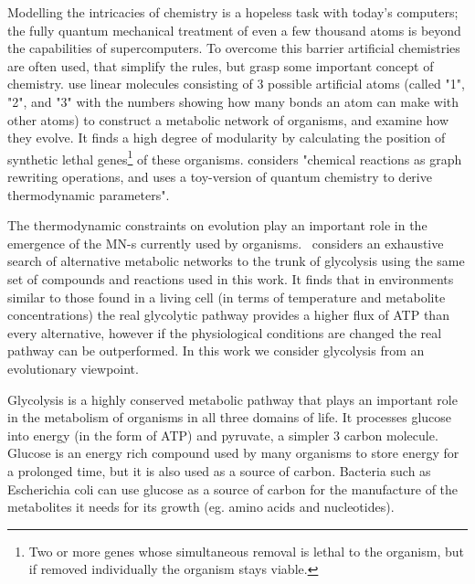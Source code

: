 \documentclass[a4paper,12pt]{article}
\begin{document}
	Modelling the intricacies of chemistry is a hopeless task with today's computers; the fully quantum mechanical treatment of even a few thousand atoms is beyond the capabilities of supercomputers. To overcome this barrier artificial chemistries are often used, that simplify the rules, but grasp some important concept of chemistry\cite{artificialreview}. \cite{evolutioncomplex} use linear molecules consisting of 3 possible  artificial atoms (called "1", "2", and "3" with the numbers showing how many bonds an atom can make with other atoms) to construct a metabolic network of organisms, and examine how they evolve. It finds a high degree of modularity by calculating the position of synthetic lethal genes\footnote{Two or more genes whose simultaneous removal is lethal to the organism, but if removed individually the organism stays viable.} of these organisms. \cite{computationalframework} considers "chemical reactions as graph rewriting operations, and uses a toy-version of quantum chemistry to derive thermodynamic parameters". %
	
	The thermodynamic constraints on evolution play an important role in the emergence of the MN-s currently used by organisms. \cite{BartekLower}~considers an exhaustive search of alternative metabolic networks to the trunk of glycolysis using the same set of compounds and reactions used in this work. It finds that in environments similar to those found in a living cell (in terms of temperature and metabolite concentrations) the real glycolytic pathway provides a higher flux of ATP than every alternative, however if the physiological conditions are changed the real pathway can be outperformed. In this work we consider glycolysis from an evolutionary viewpoint. 


	

Glycolysis is a highly conserved metabolic pathway that plays an important role in the metabolism of organisms in all three domains of life. It processes glucose into energy (in the form of ATP) and pyruvate, a simpler 3 carbon molecule. Glucose is an energy rich compound used by many organisms to store energy for a prolonged time, but it is also used as a source of carbon. Bacteria such as Escherichia coli can use glucose as a source of carbon for the manufacture of the metabolites it needs for its growth (eg. amino acids and nucleotides)\cite[]{principlesofbio}.
\end{document}
